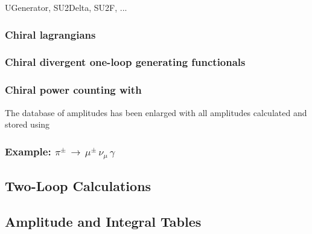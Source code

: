 
UGenerator, SU2Delta, SU2F, ...

\subsubsection{Chiral lagrangians}
\label{chptLags}

\subsubsection{Chiral divergent one-loop generating functionals}

\subsubsection{Chiral power counting with \fa}

The database of amplitudes has been enlarged with all amplitudes calculated and stored using 

\subsubsection{Example:\; $\pi^\pm \, \rightarrow  \, \mu^\pm \, \nu_\mu \, \gamma$}

\subsection{Two-Loop Calculations}

\subsection{Amplitude and Integral Tables}
